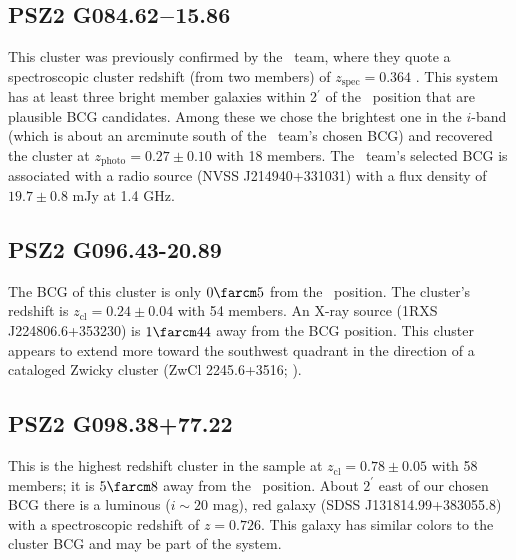 \documentclass[apj, revtex4-1]{emulateapj}
\begin{document}
\subsection{PSZ2 G084.62$-$15.86} %
This cluster was previously confirmed by the \planck\ team, where they quote a spectroscopic cluster redshift (from two members) of $z_\mathrm{spec} = 0.364$ \citep{PlanckCollaboration2016a}.
This system has at least three bright member galaxies within 2$^\prime$ of the \planck\ position that are plausible BCG candidates. Among these we chose the brightest one in the $i$-band (which is about an arcminute south of the \planck\ team's chosen BCG) and recovered the cluster at $z_\mathrm{photo} = 0.27 \pm 0.10$ with 18 members.
The \planck\ team's selected BCG is associated with a radio source (NVSS J214940+331031) with a flux density of $19.7\pm 0.8$ mJy at 1.4 GHz.

\subsection{PSZ2 G096.43-20.89} %
The BCG of this cluster is only $0\farcm5$ from the \planck\ position. The cluster's redshift is $z_\mathrm{cl} = 0.24 \pm 0.04$ with 54 members. An X-ray source (1RXS J224806.6+353230) is $1\farcm44$ away from the BCG position. This cluster appears to extend more toward the southwest quadrant in the direction of a cataloged Zwicky cluster (ZwCl 2245.6+3516; \citealt{Zwicky1968}).

\subsection{PSZ2 G098.38+77.22} %
This is the highest redshift cluster in the sample at $z_\mathrm{cl} = 0.78 \pm 0.05$ with 58 members; it is $5\farcm8$ away from the \planck\ position. About $2^\prime$ east of our chosen BCG there is a luminous ($i\sim 20$ mag), red galaxy (SDSS J131814.99+383055.8) with a spectroscopic redshift of $z=0.726$. This galaxy has similar colors to the cluster BCG and may be part of the system.
\end{document}
